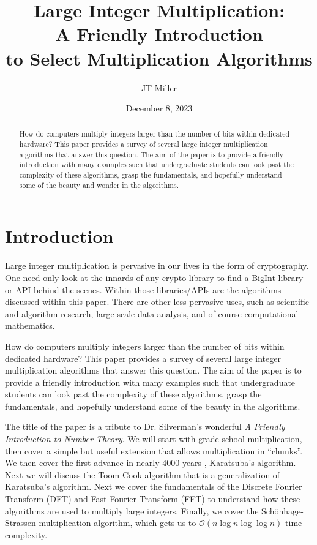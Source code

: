 \documentclass[psamsfonts,reqno]{amsart}
\title{Large Integer Multiplication:\\A Friendly Introduction\\to Select Multiplication Algorithms}
\author{JT Miller}
\date{December 8, 2023}
\theoremstyle{definition}
\theoremstyle{remark}
\numberwithin{equation}{section}
\begin{document}
\begin{abstract}

How do computers multiply integers larger than the number of bits within dedicated hardware? This paper provides a survey of several large integer multiplication algorithms that answer this question. The aim of the paper is to provide a friendly introduction with many examples such that undergraduate students can look past the complexity of these algorithms, grasp the fundamentals, and hopefully understand some of the beauty and wonder in the algorithms. 

\end{abstract}

\maketitle

\tableofcontents

\section{Introduction}

Large integer multiplication is pervasive in our lives in the form of cryptography. One need only look at the innards of any crypto library to find a BigInt library or API behind the scenes. Within those libraries/APIs are the algorithms discussed within this paper. There are other less pervasive uses, such as scientific and algorithm research, large-scale data analysis, and of course computational mathematics. 

How do computers multiply integers larger than the number of bits within dedicated hardware? This paper provides a survey of several large integer multiplication algorithms that answer this question. The aim of the paper is to provide a friendly introduction with many examples such that undergraduate students can look past the complexity of these algorithms, grasp the fundamentals, and hopefully understand some of the beauty in the algorithms. 

The title of the paper is a tribute to Dr. Silverman's wonderful \textit{A Friendly Introduction to Number Theory}. We will start with grade school multiplication, then cover a simple but useful extension that allows multiplication in ``chunks''. We then cover the first advance in nearly 4000 years \cite{burton1985history}, Karatsuba's algorithm. Next we will discuss the Toom-Cook algorithm that is a generalization of Karatsuba's algorithm. Next we cover the fundamentals of the Discrete Fourier Transform (DFT) and Fast Fourier Transform (FFT) to understand how these algorithms are used to multiply large integers. Finally, we cover the Sch\"{o}nhage-Strassen multiplication algorithm, which gets us to $\mathcal{O}(n \log n \log \log n)$ time complexity.
\end{document}
